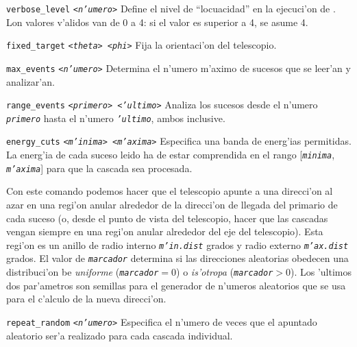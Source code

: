 \begin{Uentry}
\item[\texttt{verbose\_level} \quad
  \texttt{<\emph{n'umero}>}]
%
  Define el nivel de ``locuacidad'' en la ejecuci'on de .
  Lon valores v'alidos van de 0 a 4: si el valor es superior a 4, se
  asume 4.

\item[\texttt{fixed\_target} \quad
  \texttt{<\emph{theta}>  <\emph{phi}>}]
%
  Fija la orientaci'on del telescopio.

\item[\texttt{max\_events} \quad
  \texttt{<\emph{n'umero}>}]
%
  Determina el n'umero m'aximo de sucesos que se leer'an y analizar'an.

\item[\texttt{range\_events} \quad
  \texttt{<\emph{primero}>  <\emph{'ultimo}>}]
%
  Analiza los sucesos desde el n'umero \texttt{\emph{primero}} hasta
  el n'umero \texttt{\emph{'ultimo}}, ambos inclusive.

\item[\texttt{energy\_cuts} \quad
  \texttt{<\emph{m'inima}>  <\emph{m'axima}>}]
%
  Especifica una banda de energ'ias permitidas.  La energ'ia de cada
  suceso leido ha de estar comprendida en el rango
  [\texttt{\emph{minima}}, \texttt{\emph{m'axima}}] para que la
  cascada sea procesada.

\item[\texttt{random\_pointing} \quad
  \texttt{
    <\emph{m'in.dist}>  <\emph{m'ax.dist}>  <\emph{marcador}>  %
    <\emph{semilla1}>  <\emph{semilla2}>  }]
%
  Con este comando podemos hacer que el telescopio apunte a una
  direcci'on al azar en una regi'on anular alrededor de la direcci'on
  de llegada del primario de cada suceso (o, desde el punto de vista
  del telescopio, hacer que las cascadas vengan siempre en una regi'on
  anular alrededor del eje del telescopio).  Esta regi'on es un anillo
  de radio interno \texttt{\emph{m'in.dist}} grados y radio externo 
  \texttt{\emph{m'ax.dist}} grados.  El valor de \texttt{\emph{marcador}}
  determina si las direcciones aleatorias obedecen una distribuci'on 
  be \emph{uniforme} (\texttt{\emph{marcador}}$=0$) o \emph{is'otropa}
  (\texttt{\emph{marcador}}$>0$).  Los 'ultimos dos par'ametros son
  semillas para el generador de n'umeros aleatorios que se usa para el
  c'alculo de la nueva direcci'on.
  
\item[\texttt{repeat\_random} \quad \texttt{<\emph{n'umero}>}]
%
  Especifica el n'umero de veces que el apuntado aleatorio ser'a
  realizado para cada cascada individual.


\end{Uentry}
